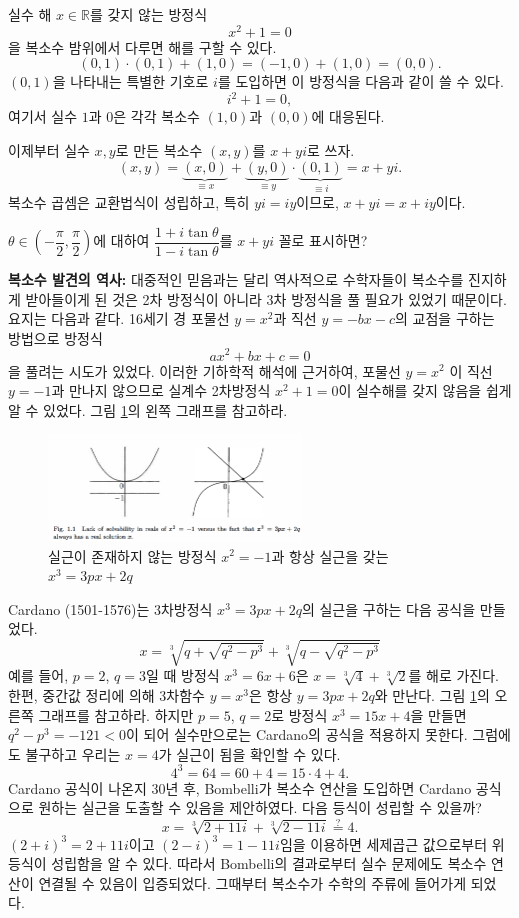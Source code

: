 실수 해 $x\in\mathbb R$를 갖지 않는 방정식
$$
x^2+1=0
$$
을 복소수 밤위에서 다루면 해를 구할 수 있다.
$$
(0,1)\cdot (0,1) + (1,0) = (-1,0) + (1,0) = (0,0).
$$
$(0,1)$을 나타내는 특별한 기호로 $i$를 도입하면 이 방정식을 다음과 같이 쓸 수 있다.
$$
i^2+1=0,
$$
여기서 실수 $1$과 $0$은 각각 복소수 $(1,0)$과 $(0,0)$에 대응된다.

이제부터 실수  $x,y$로 만든 복소수 $(x,y)$를 $x+yi$로 쓰자.
$$
(x,y) = \underbrace{(x,0)}_{\equiv x} +  \underbrace{(y,0)}_{\equiv y}
\cdot  \underbrace{(0,1)}_{\equiv i} = x+yi.
$$
복소수 곱셈은 교환법식이 성립하고, 특히 $yi = iy$이므로,
$x+yi = x+iy$이다.

\begin{salt_exercise} \label{ex-1-2}
$\theta \in \left(-\dfrac{\pi}2, \dfrac\pi2 \right)$에 대하여
$\dfrac{1+i\tan\theta}{1-i\tan\theta}$를 $x+yi$ 꼴로 표시하면?
\end{salt_exercise}

{\bf 복소수 발견의 역사: }
대중적인 믿음과는 달리 역사적으로 수학자들이 복소수를 진지하게 받아들이게 된 것은 
2차 방정식이 아니라 3차 방정식을 풀 필요가 있었기 때문이다. 요지는 다음과 같다.
16세기 경 포물선 $y=x^2$과 직선 $y=-bx-c$의 교점을 구하는  방법으로 
 방정식
$$
ax^2 + bx + c = 0
$$
을 풀려는 시도가 있었다. 
이러한 기하학적 해석에 근거하여,
포물선  $y=x^2$ 이 직선 $y=-1$과 만나지 않으므로
실계수 2차방정식 $x^2+1=0$이 실수해를 갖지 않음을 쉽게 알 수 있었다.
그림 \ref{fig-1-1}의 왼쪽 그래프를 참고하라.

\begin{figure}[!h]
\begin{center}
\includegraphics[width=0.6\textwidth]{./SaltChapter/fig-1-1}
\end{center}
\caption{실근이 존재하지 않는 방정식 $x^2=-1$과 항상 실근을 갖는 $x^3=3px+2q$}
\label{fig-1-1}
\end{figure}

Cardano (1501-1576)는 3차방정식 $x^3=3px+2q$의 실근을 구하는 다음 공식을 만들었다.
$$
x = \sqrt[3]{q+ \sqrt{q^2-p^3}} + \sqrt[3]{q- \sqrt{q^2-p^3}}
$$
예를 들어, $p=2$, $q=3$일 때 방정식 $x^3=6x+6$은 $x=\sqrt[3]{4}+\sqrt[3]{2}$를 해로 가진다.
한편, 중간값 정리에 의해 3차함수 $y=x^3$은  항상 $y=3px+2q$와 만난다.
그림 \ref{fig-1-1}의 오른쪽 그래프를 참고하라.
하지만 $p=5$, $q=2$로 방정식 $x^3=15 x+4$을 만들면 $q^2-p^3= -121<0$이 되어
실수만으로는 Cardano의 공식을 적용하지 못한다.
그럼에도 불구하고 우리는 $x=4$가 실근이 됨을 확인할 수 있다.
$$
4^3 = 64 = 60 + 4 = 15\cdot 4 + 4.
$$
Cardano 공식이 나온지 30년 후, Bombelli가 복소수 연산을 도입하면
Cardano 공식으로 원하는 실근을 도출할 수 있음을 제안하였다.
다음 등식이 성립할 수 있을까?
$$
x = \sqrt[3]{2+11i} + \sqrt[3]{2-11i} \stackrel{?}{=} 4.
$$
$(2+i)^3 = 2+11i$이고 $(2-i)^3 = 1-11i$임을 이용하면
세제곱근 값으로부터 위 등식이 성립함을 알 수 있다.
따라서 Bombelli의 결과로부터 실수 문제에도 복소수 연산이 연결될 수 있음이 입증되었다.
그때부터 복소수가 수학의 주류에 들어가게 되었다.

